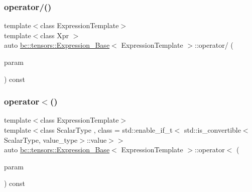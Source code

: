 \subsubsection{\texorpdfstring{operator/()}{operator/()}\hspace{0.1cm}{\footnotesize\ttfamily [2/2]}}
{\footnotesize\ttfamily template$<$class Expression\+Template$>$ \\
template$<$class Xpr $>$ \\
auto \hyperlink{classbc_1_1tensors_1_1Expression__Base}{bc\+::tensors\+::\+Expression\+\_\+\+Base}$<$ Expression\+Template $>$\+::operator/ (\begin{DoxyParamCaption}\item[{const \hyperlink{classbc_1_1tensors_1_1Expression__Base}{Expression\+\_\+\+Base}$<$ Xpr $>$ \&}]{param }\end{DoxyParamCaption}) const\hspace{0.3cm}{\ttfamily [inline]}}

\mbox{\label{classbc_1_1tensors_1_1Expression__Base_aed7de0633c020ce8e663ac2bc97340d3}} 
\subsubsection{\texorpdfstring{operator$<$()}{operator<()}\hspace{0.1cm}{\footnotesize\ttfamily [1/2]}}
{\footnotesize\ttfamily template$<$class Expression\+Template$>$ \\
template$<$class Scalar\+Type , class  = std\+::enable\+\_\+if\+\_\+t$<$   std\+::is\+\_\+convertible$<$\+Scalar\+Type, value\+\_\+type$>$\+::value$>$$>$ \\
auto \hyperlink{classbc_1_1tensors_1_1Expression__Base}{bc\+::tensors\+::\+Expression\+\_\+\+Base}$<$ Expression\+Template $>$\+::operator$<$ (\begin{DoxyParamCaption}\item[{const Scalar\+Type \&}]{param }\end{DoxyParamCaption}) const\hspace{0.3cm}{\ttfamily [inline]}}

\mbox{\label{classbc_1_1tensors_1_1Expression__Base_ae95070c9fc89fdaf4cc7e8c8e70023b4}} 
